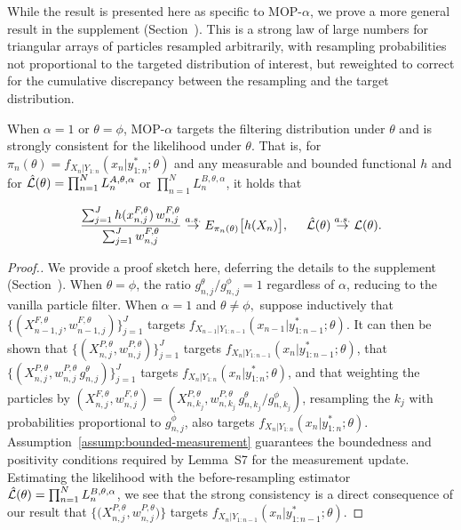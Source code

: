\documentclass[numsec,webpdf,modern,medium,namedate]{oup-authoring-template}
\newcommand\arxiv[2]{#1}
\begin{document}
While the result is presented here as specific to MOP-$\alpha$, we prove a more general result in the supplement (Section~\suppSecProofTriangularArrays).
This is a strong law of large numbers for triangular arrays of particles resampled arbitrarily, with resampling probabilities not proportional to the targeted distribution of interest, but reweighted to correct for the cumulative discrepancy between the resampling and the target distribution.


\begin{thm}
    \label{thm:mop-targeting}
    When $\alpha=1$ or $\theta=\phi$, MOP-$\alpha$ targets the filtering distribution under $\theta$ and is strongly consistent for the likelihood under $\theta$. That is, for $\pi_n(\theta)=f_{X_{n}|Y_{1:n}}(x_n|y_{1:n}^* ; \theta)$ and any measurable and bounded functional $h$ and for $\hat{\mathcal{L}}(\theta) = \prod_{n=1}^N L_n^{A,\theta,\alpha}$ or $\prod_{n=1}^N L_n^{B,\theta,\alpha}$, it holds that
    \arxiv{}{\vspace*{-1.5mm}}
    \begin{equation} \nonumber
        \frac{\sum_{j=1}^J h(x_{n,j}^{F, \theta}) \, w_{n,j}^{F,\theta}}{\sum_{j=1}^J w_{n,j}^{F,\theta}} \stackrel{a.s.}{\to} E_{\pi_n(\theta)} \big[h(X_n)\big], \hspace{5mm} \hat\lik(\theta)  \stackrel{a.s.}{\to} \lik(\theta).
    \arxiv{}{\vspace*{-1.5mm}}
    \end{equation}
\end{thm}

\begin{proof}[Proof.]
    \setlength{\emergencystretch}{2em}
    We provide a proof sketch here, deferring the details to the supplement (Section~\suppSecProofTriangularArrays). 
    When $\theta=\phi$, the ratio ${g_{n,j}^\theta}/{g_{n,j}^\phi}=1$ regardless of $\alpha$, reducing to the vanilla particle filter.
    When $\alpha=1$ and $\theta\neq\phi,$ suppose inductively that $\{(X^{F,\theta}_{n-1,j},w^{F,\theta}_{n-1,j})\}_{j=1}^J$ targets $f_{X_{n-1}|Y_{1:n-1}}(x_{n-1}|y^*_{1:n-1};\theta)$.
    It can then be shown that $\{(X^{P,\theta}_{n,j},w^{P,\theta}_{n,j})\}_{j=1}^J$ targets $f_{X_{n}|Y_{1:n-1}}(x_{n}|y^*_{1:n-1};\theta)$, that $\{(X^{P,\theta}_{n,j},w^{P,\theta}_{n,j} \, g^\theta_{n,j} )\}_{j=1}^J$ targets  $f_{X_{n}|Y_{1:n}}(x_{n}|y^*_{1:n};\theta)$, and that weighting the particles by $(X^{F,\theta}_{n,j},w^{F,\theta}_{n,j}) = (X^{P,\theta}_{n,k_j}, w^{P,\theta}_{n,k_j} \, g^\theta_{n,k_j} \big/ g^\phi_{n,k_j})$,
    resampling the $k_j$ with probabilities proportional to $g^\phi_{n,j}$, also targets $f_{X_{n}|Y_{1:n}}(x_{n}|y^*_{1:n};\theta)$.
    Assumption~\ref{assump:bounded-measurement} guarantees the boundedness and positivity conditions required by Lemma~S7 for the measurement update.
    Estimating the likelihood with the before-resampling estimator $\hat{\mathcal{L}}(\theta) = \prod_{n=1}^N L_n^{B,\theta,\alpha}$, we see that the strong consistency is a direct consequence of our result that $\{ \big(X^{P,\theta}_{n,j},w^{P,\theta}_{n,j}\big) \}$ targets $f_{X_{n}|Y_{1:n-1}}(x_{n}|y^*_{1:n-1};\theta)$. 
\end{proof}
\end{document}
